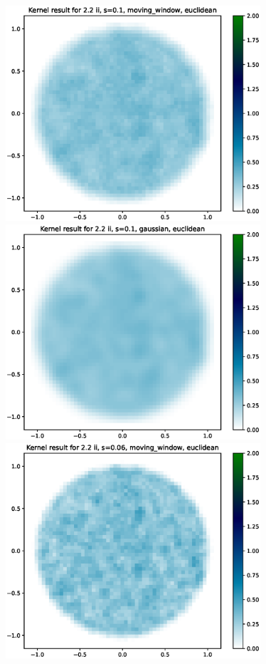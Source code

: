 \documentclass{article}
\begin{document}
\hspace*{-1.5cm}\includegraphics[height=8cm]{comparisons//Kernel_result_2-2ii_s_0-1_moving_window_euclidean.eps} \hspace*{-1.5cm}
\includegraphics[height=8cm]{comparisons//Kernel_result_2-2ii_s_0-1_gaussian_euclidean.eps} \vspace*{-3em}  \\
\hspace*{-1.5cm}\includegraphics[height=8cm]{comparisons//Kernel_result_2-2ii_s_0-06_moving_window_euclidean.eps} \hspace*{-1.5cm}
\end{document}
